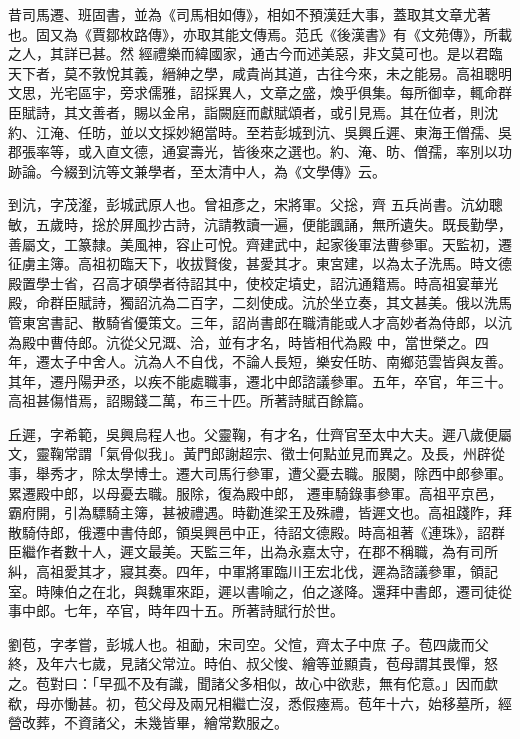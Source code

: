 
\begin{pinyinscope}

 昔司馬遷、班固書，並為《司馬相如傳》，相如不預漢廷大事，蓋取其文章尤著也。固又為《賈鄒枚路傳》，亦取其能文傳焉。范氏《後漢書》有《文苑傳》，所載之人，其詳已甚。然
 經禮樂而緯國家，通古今而述美惡，非文莫可也。是以君臨天下者，莫不敦悅其義，縉紳之學，咸貴尚其道，古往今來，未之能易。高祖聰明文思，光宅區宇，旁求儒雅，詔採異人，文章之盛，煥乎俱集。每所御幸，輒命群臣賦詩，其文善者，賜以金帛，詣闕庭而獻賦頌者，或引見焉。其在位者，則沈約、江淹、任昉，並以文採妙絕當時。至若彭城到沆、吳興丘遲、東海王僧孺、吳郡張率等，或入直文德，通宴壽光，皆後來之選也。約、淹、昉、僧孺，率別以功跡論。今綴到沆等文兼學者，至太清中人，為《文學傳》云。



 到沆，字茂瀣，彭城武原人也。曾祖彥之，宋將軍。父捴，齊
 五兵尚書。沆幼聰敏，五歲時，捴於屏風抄古詩，沆請教讀一遍，便能諷誦，無所遺失。既長勤學，善屬文，工篆隸。美風神，容止可悅。齊建武中，起家後軍法曹參軍。天監初，遷征虜主簿。高祖初臨天下，收拔賢俊，甚愛其才。東宮建，以為太子洗馬。時文德殿置學士省，召高才碩學者待詔其中，使校定墳史，詔沆通籍焉。時高祖宴華光殿，命群臣賦詩，獨詔沆為二百字，二刻使成。沆於坐立奏，其文甚美。俄以洗馬管東宮書記、散騎省優策文。三年，詔尚書郎在職清能或人才高妙者為侍郎，以沆為殿中曹侍郎。沆從父兄溉、洽，並有才名，時皆相代為殿
 中，當世榮之。四年，遷太子中舍人。沆為人不自伐，不論人長短，樂安任昉、南鄉范雲皆與友善。其年，遷丹陽尹丞，以疾不能處職事，遷北中郎諮議參軍。五年，卒官，年三十。高祖甚傷惜焉，詔賜錢二萬，布三十匹。所著詩賦百餘篇。



 丘遲，字希範，吳興烏程人也。父靈鞠，有才名，仕齊官至太中大夫。遲八歲便屬文，靈鞠常謂「氣骨似我」。黃門郎謝超宗、徵士何點並見而異之。及長，州辟從事，舉秀才，除太學博士。遷大司馬行參軍，遭父憂去職。服闋，除西中郎參軍。累遷殿中郎，以母憂去職。服除，復為殿中郎，
 遷車騎錄事參軍。高祖平京邑，霸府開，引為驃騎主簿，甚被禮遇。時勸進梁王及殊禮，皆遲文也。高祖踐阼，拜散騎侍郎，俄遷中書侍郎，領吳興邑中正，待詔文德殿。時高祖著《連珠》，詔群臣繼作者數十人，遲文最美。天監三年，出為永嘉太守，在郡不稱職，為有司所糾，高祖愛其才，寢其奏。四年，中軍將軍臨川王宏北伐，遲為諮議參軍，領記室。時陳伯之在北，與魏軍來距，遲以書喻之，伯之遂降。還拜中書郎，遷司徒從事中郎。七年，卒官，時年四十五。所著詩賦行於世。



 劉苞，字孝嘗，彭城人也。祖勔，宋司空。父愃，齊太子中庶
 子。苞四歲而父終，及年六七歲，見諸父常泣。時伯、叔父悛、繪等並顯貴，苞母謂其畏憚，怒之。苞對曰：「早孤不及有識，聞諸父多相似，故心中欲悲，無有佗意。」因而歔欷，母亦慟甚。初，苞父母及兩兄相繼亡沒，悉假瘞焉。苞年十六，始移墓所，經營改葬，不資諸父，未幾皆畢，繪常歎服之。




\end{pinyinscope}
